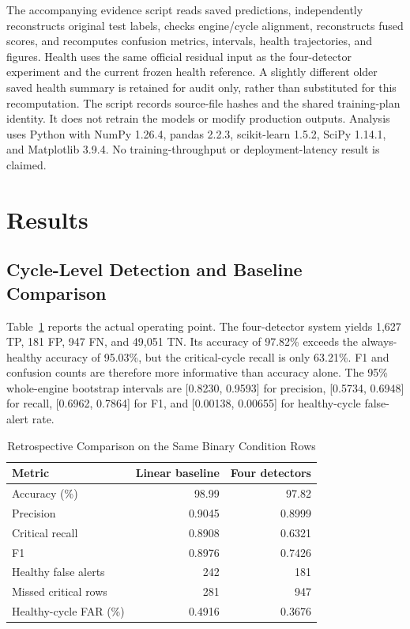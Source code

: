 \documentclass[conference]{IEEEtran}
\begin{document}
The accompanying evidence script reads saved predictions, independently reconstructs original test labels, checks engine/cycle alignment, reconstructs fused scores, and recomputes confusion metrics, intervals, health trajectories, and figures. Health uses the same official residual input as the four-detector experiment and the current frozen health reference. A slightly different older saved health summary is retained for audit only, rather than substituted for this recomputation. The script records source-file hashes and the shared training-plan identity. It does not retrain the models or modify production outputs. Analysis uses Python with NumPy 1.26.4, pandas 2.2.3, scikit-learn 1.5.2, SciPy 1.14.1, and Matplotlib 3.9.4. No training-throughput or deployment-latency result is claimed.

\section{Results}
\subsection{Cycle-Level Detection and Baseline Comparison}
Table~\ref{tab:comparison} reports the actual operating point. The four-detector system yields 1,627 TP, 181 FP, 947 FN, and 49,051 TN. Its accuracy of 97.82\% exceeds the always-healthy accuracy of 95.03\%, but the critical-cycle recall is only 63.21\%. F1 and confusion counts are therefore more informative than accuracy alone. The 95\% whole-engine bootstrap intervals are [0.8230, 0.9593] for precision, [0.5734, 0.6948] for recall, [0.6962, 0.7864] for F1, and [0.00138, 0.00655] for healthy-cycle false-alert rate.

\begin{table}[t]
\caption{Retrospective Comparison on the Same Binary Condition Rows}
\label{tab:comparison}
\centering
\begin{tabular}{lrr}
\toprule
Metric & Linear baseline & Four detectors\\
\midrule
Accuracy (\%) & 98.99 & 97.82\\
Precision & 0.9045 & 0.8999\\
Critical recall & 0.8908 & 0.6321\\
F1 & 0.8976 & 0.7426\\
Healthy false alerts & 242 & 181\\
Missed critical rows & 281 & 947\\
Healthy-cycle FAR (\%) & 0.4916 & 0.3676\\
\bottomrule
\end{tabular}
\end{table}
\end{document}
